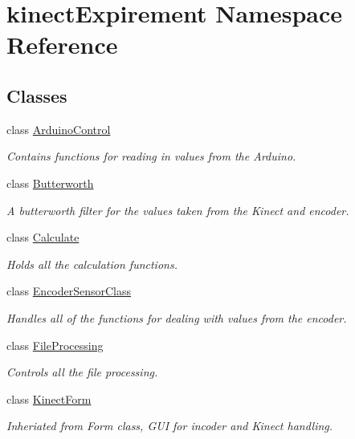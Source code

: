 \hypertarget{namespacekinect_expirement}{}\section{kinect\+Expirement Namespace Reference}
\label{namespacekinect_expirement}
\subsection*{Classes}
\begin{DoxyCompactItemize}
\item 
class \hyperlink{classkinect_expirement_1_1_arduino_control}{Arduino\+Control}
\begin{DoxyCompactList}\small\item\em Contains functions for reading in values from the Arduino. \end{DoxyCompactList}\item 
class \hyperlink{classkinect_expirement_1_1_butterworth}{Butterworth}
\begin{DoxyCompactList}\small\item\em A butterworth filter for the values taken from the Kinect and encoder.\end{DoxyCompactList}\item 
class \hyperlink{classkinect_expirement_1_1_calculate}{Calculate}
\begin{DoxyCompactList}\small\item\em Holds all the calculation functions.\end{DoxyCompactList}\item 
class \hyperlink{classkinect_expirement_1_1_encoder_sensor_class}{Encoder\+Sensor\+Class}
\begin{DoxyCompactList}\small\item\em Handles all of the functions for dealing with values from the encoder. \end{DoxyCompactList}\item 
class \hyperlink{classkinect_expirement_1_1_file_processing}{File\+Processing}
\begin{DoxyCompactList}\small\item\em Controls all the file processing.\end{DoxyCompactList}\item 
class \hyperlink{classkinect_expirement_1_1_kinect_form}{Kinect\+Form}
\begin{DoxyCompactList}\small\item\em Inheriated from Form class, G\+UI for incoder and Kinect handling. \end{DoxyCompactList}\item 

\end{DoxyCompactItemize}
